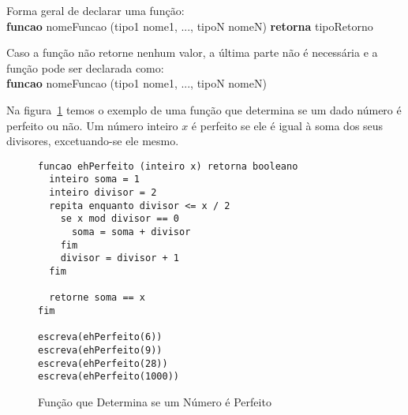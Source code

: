 \documentclass{report}
\begin{document}
Forma geral de declarar uma função: \\
\textbf{funcao} nomeFuncao (tipo1 nome1, ..., tipoN nomeN) \textbf{retorna} tipoRetorno

Caso a função não retorne nenhum valor, a última parte não é necessária e a
função pode ser declarada como: \\
\textbf{funcao} nomeFuncao (tipo1 nome1, ..., tipoN nomeN)


Na figura~\ref{fig:perfeito} temos o exemplo de uma função que
determina se um dado número é perfeito ou não. Um número inteiro
$x$ é perfeito se ele é igual à soma dos seus divisores, excetuando-se
ele mesmo. 

\begin{figure}
\begin{verbatim}
funcao ehPerfeito (inteiro x) retorna booleano
  inteiro soma = 1
  inteiro divisor = 2
  repita enquanto divisor <= x / 2
    se x mod divisor == 0
      soma = soma + divisor
    fim
    divisor = divisor + 1
  fim	

  retorne soma == x
fim

escreva(ehPerfeito(6))
escreva(ehPerfeito(9))
escreva(ehPerfeito(28))
escreva(ehPerfeito(1000))
\end{verbatim}
\caption{Função que Determina se um Número é Perfeito}
\label{fig:perfeito}
\end{figure}
\end{document}
